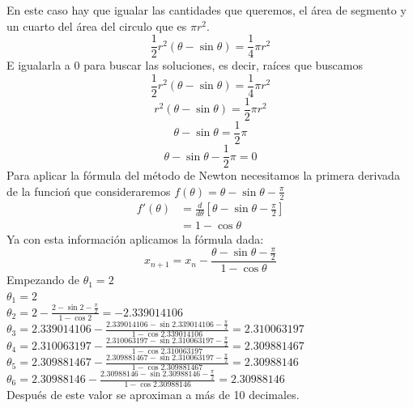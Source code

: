 \documentclass[12pt]{article}
\begin{document}
En este caso hay que igualar las cantidades que queremos, el área de segmento y un cuarto del área del circulo que es $\pi r^2$. 
\[
 \frac{1}{2} r^2 (\theta - \sin{\theta}) = \frac{1}{4} \pi r^2
 \]
 E igualarla a 0 para buscar las soluciones, es decir, raíces que buscamos
 \[
 \frac{1}{2} r^2 (\theta - \sin{\theta}) = \frac{1}{4} \pi r^2
 \]
 \[
 r^2 (\theta - \sin{\theta}) = \frac{1}{2} \pi r^2
 \]
  \[
 \theta - \sin{\theta} = \frac{1}{2} \pi 
  \]
  \[
 \theta - \sin{\theta} - \frac{1}{2} \pi = 0
 \]
 Para aplicar la fórmula del método de Newton necesitamos la primera derivada de la funcioń que consideraremos $f(\theta) = \theta - \sin{\theta} - \frac{\pi}{2}$
 \begin{align*}
  f'(\theta)
  &= \frac{d}{d\theta} \left[  \theta - \sin{\theta} - \frac{\pi}{2} \right]\\
  &=   1 - \cos{\theta} 
 \end{align*}
 Ya con esta información aplicamos la fórmula dada:
 \[
 x_{n+1} = x_n - \frac{ \theta - \sin{\theta} - \frac{\pi}{2}}{ 1 - \cos{\theta} }
 \]
 Empezando de $\theta_1=2$\\
 $\theta_1 = 2$ \\
 $\theta_2 =  2 - \frac{ 2 - \sin{2} - \frac{\pi}{2}}{ 1 - \cos{2} }   = -2.339014106$ \\
 $\theta_3 =  2.339014106 - \frac{ 2.339014106 - \sin{2.339014106} - \frac{\pi}{2}}{ 1 - \cos{2.339014106} } = 2.310063197$ \\
 $\theta_4 =  2.310063197 - \frac{2.310063197 - \sin{2.310063197} - \frac{\pi}{2}}{ 1 - \cos{2.310063197} } = 2.309881467$ \\
 $\theta_5 =  2.309881467 - \frac{2.309881467 - \sin{2.310063197} - \frac{\pi}{2}}{ 1 - \cos{2.309881467} } = 2.30988146$ \\
 $\theta_6 =  2.30988146 - \frac{2.30988146 - \sin{2.30988146} - \frac{\pi}{2}}{ 1 - \cos{2.30988146} } = 2.30988146$ \\

 Después de este valor se aproximan a más de 10 decimales.
\end{document}
